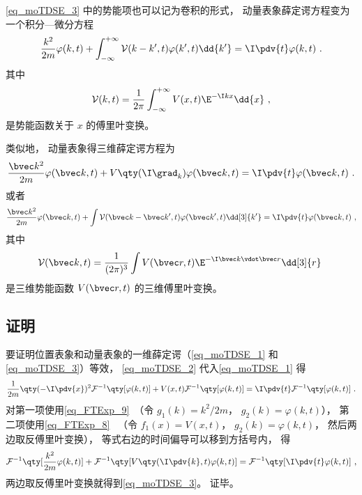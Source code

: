 \autoref{eq_moTDSE_3} 中的势能项也可以记为卷积的形式， 动量表象薛定谔方程变为一个积分—微分方程
\begin{equation}\label{eq_moTDSE_4}
\frac{k^2}{2m}\varphi(k, t) + \int_{-\infty}^{+\infty} \mathcal{V}(k-k', t) \varphi(k', t) \dd{k'} = \I \pdv{t} \varphi(k,t)~.
\end{equation}
其中
\begin{equation}
\mathcal{V}(k, t) = \frac{1}{2\pi}\int_{-\infty}^{+\infty} V(x,t)\E^{-\I kx}\dd{x}~,
\end{equation}
是势能函数关于 $x$ 的傅里叶变换。

类似地， 动量表象得三维薛定谔方程为
\begin{equation}
\frac{\bvec k^2}{2m}\varphi(\bvec k, t) + V\qty(\I \grad_k)\varphi(\bvec k, t) = \I \pdv{t} \varphi(\bvec k,t)~.
\end{equation}
或者
\begin{equation}
\frac{\bvec k^2}{2m}\varphi(\bvec k, t) + \int \mathcal{V}(\bvec k-\bvec k', t) \varphi(\bvec k', t)\dd[3]{k'} = \I \pdv{t} \varphi(\bvec k,t)~,
\end{equation}
其中
\begin{equation}
\mathcal{V}(\bvec k, t) = \frac{1}{(2\pi)^{3}} \int V(\bvec r, t) \E^{-\I \bvec k \vdot \bvec r}\dd[3]{r}~
\end{equation}
是三维势能函数 $V(\bvec r, t)$ 的三维傅里叶变换。 %

\subsection{证明}
要证明位置表象和动量表象的一维薛定谔（\autoref{eq_moTDSE_1} 和\autoref{eq_moTDSE_3}）等效， \autoref{eq_moTDSE_2} 代入\autoref{eq_moTDSE_1} 得
\begin{equation}\label{eq_moTDSE_5}
\frac{1}{2m}\qty(-\I\pdv{x})^2 \mathcal{F}^{-1}\qty[\varphi(k, t)] + V(x, t)\mathcal{F}^{-1}\qty[\varphi(k, t)] = \I \pdv{t}\mathcal{F}^{-1}\qty[\varphi(k, t)]~.
\end{equation}
对第一项使用\autoref{eq_FTExp_9}~（令 $g_1(k) = k^2/2m$， $g_2(k) = \varphi(k, t)$）， 第二项使用\autoref{eq_FTExp_8}~ （令 $f_1(x) = V(x, t)$， $g_2(k) = \varphi(k, t)$， 然后两边取反傅里叶变换）， 等式右边的时间偏导可以移到方括号内， 得
\begin{equation}
\mathcal{F}^{-1}\qty[\frac{k^2}{2m}\varphi(k,t)] + \mathcal{F}^{-1}\qty[V\qty(\I \pdv{k}, t)\varphi(k,t)] = \mathcal{F}^{-1}\qty[\I \pdv{t}\varphi(k,t)]~,
\end{equation}
两边取反傅里叶变换就得到\autoref{eq_moTDSE_3}。 证毕。

